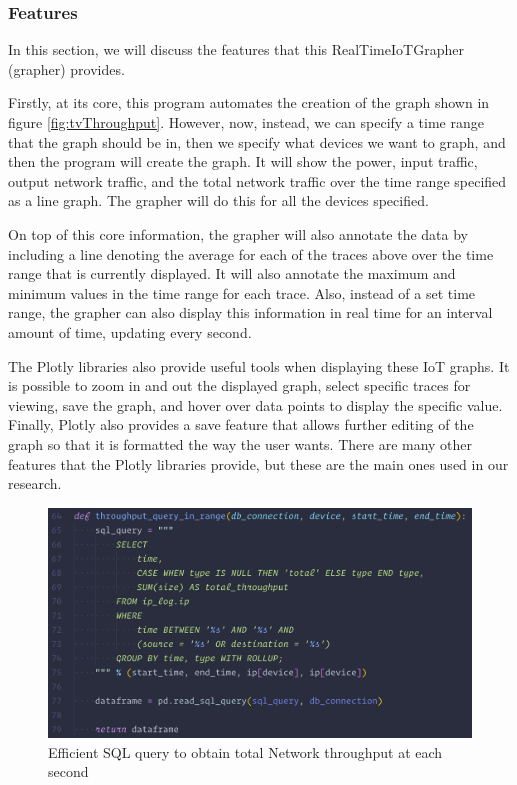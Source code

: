 \subsubsection{Features}
\label{Features}

In this section, we will discuss the features that this RealTimeIoTGrapher (grapher) provides.

Firstly, at its core, this program automates the creation of the graph shown in figure \ref{fig:tvThroughput}. However, now, instead, we can specify a time range that the graph should be in, then we specify what devices we want to graph, and then the program will create the graph. It will show the power, input traffic, output network traffic, and the total network traffic over the time range specified as a line graph. The grapher will do this for all the devices specified.

On top of this core information, the grapher will also annotate the data by including a line denoting the average for each of the traces above over the time range that is currently displayed. It will also annotate the maximum and minimum values in the time range for each trace. Also, instead of a set time range, the grapher can also display this information in real time for an interval amount of time, updating every second.

The Plotly libraries also provide useful tools when displaying these IoT graphs. It is possible to zoom in and out the displayed graph, select specific traces for viewing, save the graph, and hover over data points to display the specific value. Finally, Plotly also provides a save feature that allows further editing of the graph so that it is formatted the way the user wants. There are many other features that the Plotly libraries provide, but these are the main ones used in our research.

\begin{figure}[H]
    \centering
    \includegraphics[width=1\textwidth]{figures/rollup.png}
    \caption{Efficient SQL query to obtain total Network throughput at each second}
    \label{fig:rollup}
\end{figure}

